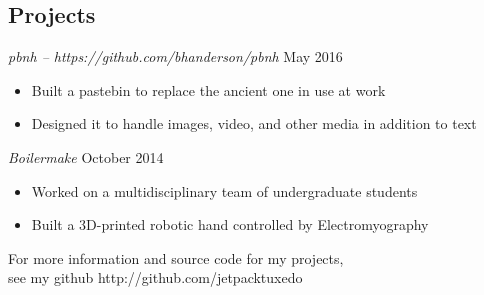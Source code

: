 \documentclass[line,margin]{res}
\newenvironment{tightcenter}{%
  \setlength\topsep{0pt}
  \setlength\parskip{0pt}
  \begin{center}
  }{\end{center}}
\begin{document}
\begin{resume}
  \section{\textcolor{TealBlue}{Projects}}
    {\sl pbnh -- https://github.com/bhanderson/pbnh\/} \hfill May 2016 %
      \begin{itemize}
	\setlength{\itemsep}{-2pt}
        \item Built a pastebin to replace the ancient one in use at work
        \item Designed it to handle images, video, and other media in addition to text
      \end{itemize}

    {\sl Boilermake\/} \hfill October 2014
      \begin{itemize}
	\setlength{\itemsep}{-2pt}
        \item Worked on a multidisciplinary team of undergraduate students
        \item Built a 3D-printed robotic hand controlled by Electromyography
      \end{itemize}

\end{resume}

\vfill
\begin{tightcenter}
For more information and source code for my projects,\\
see my github http://github.com/jetpacktuxedo
\end{tightcenter}
\end{document}
